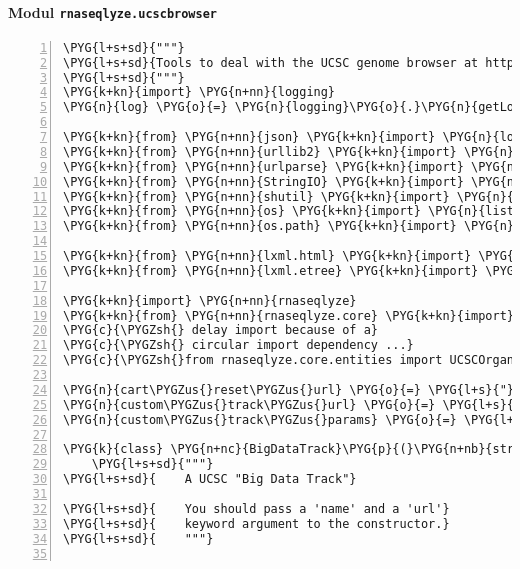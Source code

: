 \paragraph{Modul \texttt{rnaseqlyze.ucscbrowser}}
\label{rnaseqlyze-pdf:modul-rnaseqlyze-ucscbrowser}
\begin{Verbatim}[commandchars=\\\{\},numbers=left,firstnumber=1,stepnumber=5]
\PYG{l+s+sd}{"""}
\PYG{l+s+sd}{Tools to deal with the UCSC genome browser at http://archaea.ucsc.edu/}
\PYG{l+s+sd}{"""}
\PYG{k+kn}{import} \PYG{n+nn}{logging}
\PYG{n}{log} \PYG{o}{=} \PYG{n}{logging}\PYG{o}{.}\PYG{n}{getLogger}\PYG{p}{(}\PYG{n}{\PYGZus{}\PYGZus{}name\PYGZus{}\PYGZus{}}\PYG{p}{)}

\PYG{k+kn}{from} \PYG{n+nn}{json} \PYG{k+kn}{import} \PYG{n}{load}
\PYG{k+kn}{from} \PYG{n+nn}{urllib2} \PYG{k+kn}{import} \PYG{n}{urlopen}
\PYG{k+kn}{from} \PYG{n+nn}{urlparse} \PYG{k+kn}{import} \PYG{n}{urljoin}
\PYG{k+kn}{from} \PYG{n+nn}{StringIO} \PYG{k+kn}{import} \PYG{n}{StringIO}
\PYG{k+kn}{from} \PYG{n+nn}{shutil} \PYG{k+kn}{import} \PYG{n}{copyfileobj}
\PYG{k+kn}{from} \PYG{n+nn}{os} \PYG{k+kn}{import} \PYG{n}{listdir}\PYG{p}{,} \PYG{n}{makedirs}
\PYG{k+kn}{from} \PYG{n+nn}{os.path} \PYG{k+kn}{import} \PYG{n}{join}\PYG{p}{,} \PYG{n}{dirname}\PYG{p}{,} \PYG{n}{isdir}

\PYG{k+kn}{from} \PYG{n+nn}{lxml.html} \PYG{k+kn}{import} \PYG{n}{parse}
\PYG{k+kn}{from} \PYG{n+nn}{lxml.etree} \PYG{k+kn}{import} \PYG{n}{dump}

\PYG{k+kn}{import} \PYG{n+nn}{rnaseqlyze}
\PYG{k+kn}{from} \PYG{n+nn}{rnaseqlyze.core} \PYG{k+kn}{import} \PYG{n}{security}
\PYG{c}{\PYGZsh{} delay import because of a}
\PYG{c}{\PYGZsh{} circular import dependency ...}
\PYG{c}{\PYGZsh{}from rnaseqlyze.core.entities import UCSCOrganism}

\PYG{n}{cart\PYGZus{}reset\PYGZus{}url} \PYG{o}{=} \PYG{l+s}{"}\PYG{l+s}{http://archaea.ucsc.edu/cgi-bin/cartReset}\PYG{l+s}{"}
\PYG{n}{custom\PYGZus{}track\PYGZus{}url} \PYG{o}{=} \PYG{l+s}{"}\PYG{l+s}{http://archaea.ucsc.edu/cgi-bin/hgTracks}\PYG{l+s}{"}
\PYG{n}{custom\PYGZus{}track\PYGZus{}params} \PYG{o}{=} \PYG{l+s}{"}\PYG{l+s}{?db=\PYGZob{}org\PYGZus{}db\PYGZcb{}\&hgt.customText=\PYGZob{}track\PYGZus{}url\PYGZcb{}}\PYG{l+s}{"}

\PYG{k}{class} \PYG{n+nc}{BigDataTrack}\PYG{p}{(}\PYG{n+nb}{str}\PYG{p}{)}\PYG{p}{:}
    \PYG{l+s+sd}{"""}
\PYG{l+s+sd}{    A UCSC "Big Data Track"}

\PYG{l+s+sd}{    You should pass a 'name' and a 'url'}
\PYG{l+s+sd}{    keyword argument to the constructor.}
\PYG{l+s+sd}{    """}


\end{Verbatim}
